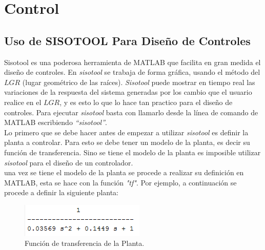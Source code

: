 \documentclass[a4paper,12pt,twoside]{proyectotanquesecci}
\begin{document}
\newpage




\section{Control}

\subsection{Uso de SISOTOOL Para Diseño de Controles}

Sisotool es una poderosa herramienta de MATLAB que facilita en gran medida el diseño de controles. En \textit{sisotool} se trabaja de forma gráfica, usando el  método del $LGR$ (lugar geométrico de las raíces). \textit{Sisotool} puede mostrar en tiempo real las variaciones  de la respuesta del sistema generadas por los cambio que el usuario realice en el $LGR$, y es esto lo que lo hace tan practico para el diseño de controles. Para ejecutar \textit{sisotool} basta con llamarlo desde la línea de comando de MATLAB  escribiendo \textit{“sisotool”}. \\

Lo primero que se debe hacer antes de empezar a utilizar \textit{sisotool} es definir la planta a controlar. Para esto se debe tener un modelo de la planta, es decir su función de transferencia. Sino se tiene el modelo de la planta es imposible utilizar \textit{sisotool} para el diseño de un controlador. \\

una vez se tiene el modelo de la planta se procede a realizar su definición en MATLAB, esta se hace con la función \textit{"tf"}. Por ejemplo, a continuación se procede a definir la siguiente planta: \\

\begin{figure}[h]
\centering
\includegraphics[scale=1.0]{FuncionPlanta}
\renewcommand{\figurename}{Fig.}
\caption{Función de transferencia de la Planta.}
\label{Función de transferencia de la Planta.}
\end{figure}
\end{document}
